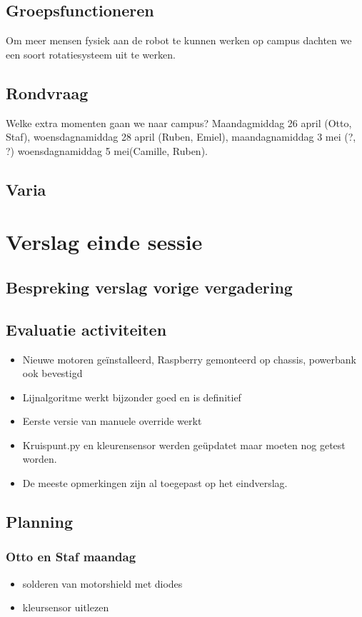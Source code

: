 \documentclass[a4paper,kulak]{kulakarticle} %
\begin{document}
\subsection{Groepsfunctioneren}
Om meer mensen fysiek aan de robot te kunnen werken op campus dachten we een soort rotatiesysteem uit te werken. 
\subsection{Rondvraag}
Welke extra momenten gaan we naar campus? Maandagmiddag 26 april (Otto, Staf), woensdagnamiddag 28 april (Ruben, Emiel), maandagnamiddag 3 mei (?, ?) woensdagnamiddag 5 mei(Camille, Ruben).

\subsection{Varia}




\section{Verslag einde sessie}

\subsection{Bespreking verslag vorige vergadering}

\subsection{Evaluatie activiteiten}
\begin{itemize}
	\item Nieuwe motoren geïnstalleerd, Raspberry gemonteerd op chassis, powerbank ook bevestigd
	\item Lijnalgoritme werkt bijzonder goed en is definitief
	\item Eerste versie van manuele override werkt
	\item Kruispunt.py en kleurensensor werden geüpdatet maar moeten nog getest worden.
	\item De meeste opmerkingen zijn al toegepast op het eindverslag.
\end{itemize}
\subsection{Planning}

\subsubsection*{Otto en Staf maandag}
\begin{itemize}
	\item solderen van motorshield met diodes
	\item kleursensor uitlezen
\end{itemize}
\end{document}
